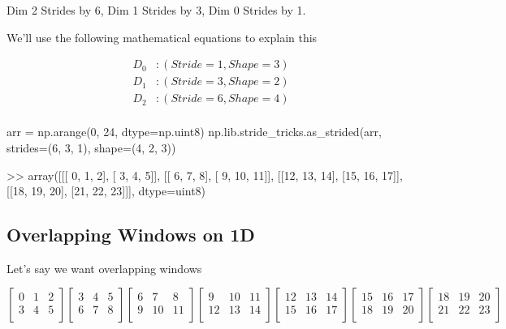 \documentclass[oneside, 12pt]{report}
\begin{document}
\begin{shaded}
Dim 2 Strides by 6,
Dim 1 Strides by 3,
Dim 0 Strides by 1.

We'll use the following mathematical equations to explain this
\end{shaded}
\begin{align*}
D_0&:(Stride=1, Shape=3)\\
D_1&:(Stride=3, Shape=2)\\
D_2&:(Stride=6, Shape=4)\\
\end{align*}

\begin{python}
arr = np.arange(0, 24, dtype=np.uint8)
np.lib.stride_tricks.as_strided(arr, strides=(6, 3, 1), shape=(4, 2, 3))

>> array([[[ 0,  1,  2],
           [ 3,  4,  5]],
          [[ 6,  7,  8],
           [ 9, 10, 11]],
          [[12, 13, 14],
           [15, 16, 17]],
          [[18, 19, 20],
           [21, 22, 23]]], dtype=uint8)
\end{python}

\newpage

\subsection{Overlapping Windows on 1D}

Let's say we want overlapping windows

\begin{equation*}
\begin{bmatrix}
0 & 1 & 2 \\
3 & 4 & 5 \\
\end{bmatrix}
\begin{bmatrix}
3 & 4 & 5 \\
6 & 7 & 8 \\
\end{bmatrix}
\begin{bmatrix}
6 & 7 & 8 \\
9 & 10 & 11 \\
\end{bmatrix}
\begin{bmatrix}
9 & 10 & 11 \\
12 & 13 & 14 \\
\end{bmatrix}
\begin{bmatrix}
12 & 13 & 14 \\
15 & 16 & 17 \\
\end{bmatrix}
\begin{bmatrix}
15 & 16 & 17 \\
18 & 19 & 20 \\
\end{bmatrix}
\begin{bmatrix}
18 & 19 & 20 \\
21 & 22 & 23 \\
\end{bmatrix}
\end{equation*}
\end{document}
